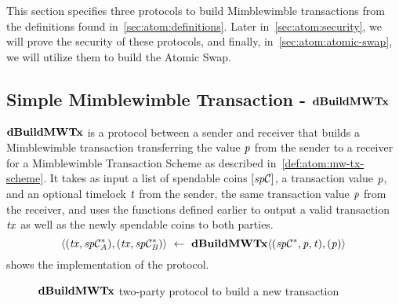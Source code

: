 This section specifies three protocols to build Mimblewimble transactions from the definitions found in~\cref{sec:atom:definitions}.
Later in~\cref{sec:atom:security}, we will prove the security of these protocols, and finally, in~\cref{sec:atom:atomic-swap}, we will utilize them to build the Atomic Swap.

\subsection{Simple Mimblewimble Transaction - $\mathbf{dBuildMWTx}$} \label{subsec:atom:simple-mw-tx}

$\mathbf{dBuildMWTx}$ is a protocol between a sender and receiver that builds a Mimblewimble transaction transferring the value $\mathit{p}$ from the sender to a receiver for a Mimblewimble Transaction Scheme as described in~\cref{def:atom:mw-tx-scheme}.
It takes as input a list of spendable coins $[\mathit{sp}\mathcal{C}]$, a transaction value $\mathit{p}$, and an optional timelock $\mathit{t}$ from the sender, the same transaction value $\mathit{p}$ from the receiver, and uses the functions defined earlier to output a valid transaction $\mathit{tx}$ as well as the newly spendable coins to both parties.
\[ \langle (\mathit{tx}, \mathit{sp}\mathcal{C}_{\mathit{A}}^*), (\mathit{tx}, \mathit{sp}\mathcal{C}_{\mathit{B}}^*) \rangle ~\leftarrow~ \mathbf{dBuildMWTx} \langle(\mathit{sp}\mathcal{C}^*,\mathit{p},\mathit{t}), (\mathit{p})\rangle \]
 shows the implementation of the protocol.

\begin{figure}
    \begin{center}
    \end{center}
    \caption{$\mathbf{dBuildMWTx}$ two-party protocol to build a new transaction} \label{fig:d-build-mw-tx}
\end{figure}

